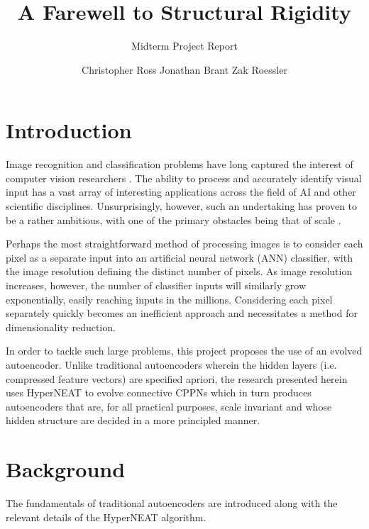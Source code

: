 \documentclass{acm_proc_article-sp}
\begin{document}
\title{A Farewell to Structural Rigidity}
\subtitle{Midterm Project Report}

\author{
\alignauthor Christopher Ross	
\alignauthor Jonathan Brant
\alignauthor Zak Roessler
}

\maketitle

\section{Introduction}
Image recognition and classification problems have long captured the interest of computer vision researchers \cite{Temp}.  The ability to process and accurately identify visual input has a vast array of interesting applications across the field of AI and other scientific disciplines.  Unsurprisingly, however, such an undertaking has proven to be a rather ambitious, with one of the primary obstacles being that of scale \cite{Temp}.

Perhaps the most straightforward method of processing images is to consider each pixel as a separate input into an artificial neural network (ANN) classifier, with the image resolution defining the distinct number of pixels.  As image resolution increases, however, the number of classifier inputs will similarly grow exponentially, easily reaching inputs in the millions.  Considering each pixel separately quickly becomes an inefficient approach and necessitates a method for dimensionality reduction.

In order to tackle such large problems, this project proposes the use of an evolved autoencoder. Unlike traditional autoencoders wherein the hidden layers (i.e. compressed feature vectors) are specified apriori, the research presented herein uses HyperNEAT to evolve connective CPPNs which in turn produces autoencoders that are, for all practical purposes, scale invariant and whose hidden structure are decided in a more principled manner.


\section{Background}
The fundamentals of traditional autoencoders are introduced along with the relevant details of the HyperNEAT algorithm.
\end{document}
